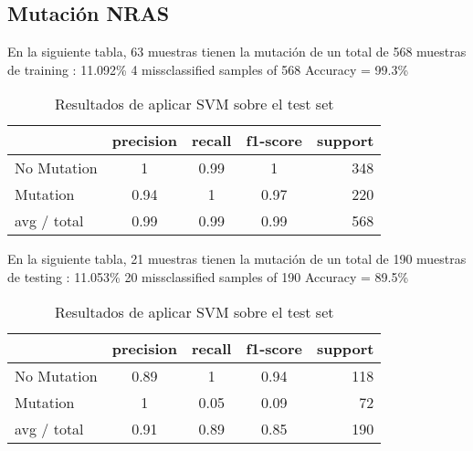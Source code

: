 \documentclass[11pt,spanish,listoffigures,listoftables]{tfgetsinf}
\begin{document}
\begin{table}[t]

\subsection{Mutaci\'on NRAS}

En la siguiente tabla, 63 muestras tienen la mutaci\'on de un total de 568 muestras de training : 11.092\% 
      4 missclassified samples of 568 Accuracy = 99.3\%

\caption{Resultados de aplicar SVM sobre el trainning set }
\begin{tabular}{l*{3}{c}r}
              & precision   & recall  &f1-score   &support\\
\hline
No Mutation & 1 & 0.99 & 1 &  348\\
Mutation & 0.94 & 1 & 0.97 &  220\\
\hline
avg / total & 0.99 & 0.99 & 0.99 &  568\\
\end{tabular}
\newline
\newline
En la siguiente tabla, 21 muestras tienen la mutaci\'on de un total de 190 muestras de testing : 11.053\% 
      20 missclassified samples of 190 Accuracy = 89.5\%


\caption{Resultados de aplicar SVM sobre el test set}
\begin{tabular}{l*{3}{c}r}
              & precision   & recall  &f1-score   &support\\
\hline
No Mutation &  0.89 & 1 & 0.94&  118\\
Mutation &  1 & 0.05 & 0.09 &  72\\
\hline
avg / total & 0.91 & 0.89 & 0.85 &  190\\
\end{tabular}
\end{table}
\end{document}

